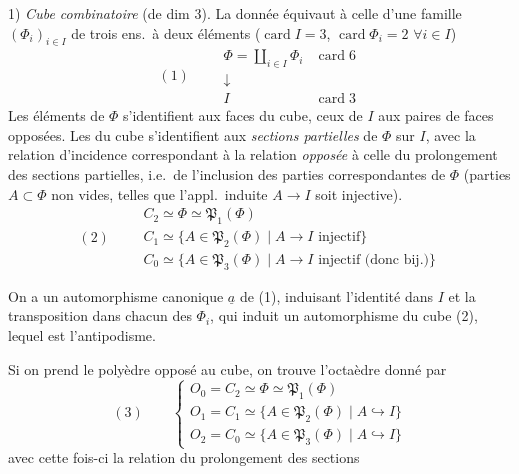 \documentclass[11pt,a4paper]{article}
\begin{document}
1) \emph{Cube combinatoire} (de dim $3$). La donnée équivaut à celle d'une famille $(\Phi_i)_{i \in I}$ de trois ens.\ à deux éléments ($\operatorname{card} I = 3$, $\operatorname{card} \Phi_i = 2$ $\forall i \in I$)
\[
(1) \qquad
\begin{array}{cl}
\Phi = \coprod_{i \in I} \Phi_i & \operatorname{card} 6 \\
\downarrow & \\
I & \operatorname{card} 3
\end{array}
\]
Les éléments de $\Phi$ s'identifient aux faces du cube, ceux de $I$ aux paires de faces opposées. Les  du cube s'identifient aux \emph{sections partielles}  de $\Phi$ sur $I$, avec la relation d'incidence correspondant à la relation \emph{opposée}  à celle du prolongement des sections partielles, i.e.\ de l'inclusion des parties correspondantes de $\Phi$ (parties $A \subset \Phi$ non vides, telles que l'appl.\ induite $A \to I$ soit injective).
\[
(2) \qquad
\begin{array}{l}
C_2 \simeq \Phi \simeq \mathfrak{P}_1(\Phi) \\
C_1 \simeq \lbrace A \in \mathfrak{P}_2(\Phi) \mid A \to I \text{ injectif} \rbrace \\
C_0 \simeq \lbrace A \in \mathfrak{P}_3(\Phi) \mid A \to I \text{ injectif (donc bij.)} \rbrace
\end{array}
\]

On a un automorphisme  canonique $\underline{a}$ de (1), induisant l'identité dans $I$ et la transposition dans chacun des $\Phi_i$, qui induit un automorphisme  du cube (2), lequel est l'antipodisme.

Si on prend le polyèdre opposé au cube, on trouve l'octaèdre donné par
\[
(3) \qquad
\left\lbrace
\begin{array}{l}
O_0 = C_2 \simeq \Phi \simeq \mathfrak{P}_1(\Phi) \\
O_1 = C_1 \simeq \lbrace A \in \mathfrak{P}_2(\Phi) \mid A \hookrightarrow I \rbrace \\
O_2 = C_0 \simeq \lbrace A \in \mathfrak{P}_3(\Phi) \mid A \hookrightarrow I \rbrace
\end{array}
\right.
\]
avec cette fois-ci la relation   du prolongement des sections
\end{document}
